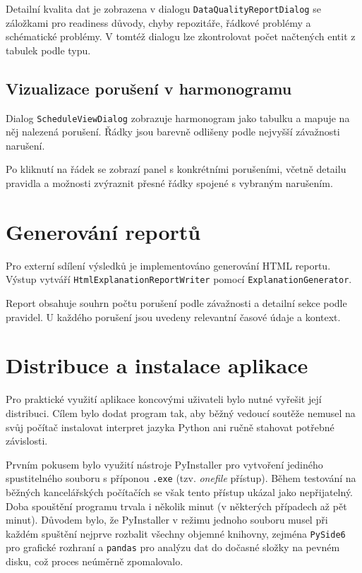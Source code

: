 \documentclass[czech, kiv, ba, he, iso690alph, pdf]{fasthesis}
\begin{document}
				Detailní kvalita dat je zobrazena v dialogu \texttt{DataQualityReportDialog} se záložkami pro readiness důvody, chyby repozitáře, řádkové problémy a schématické problémy. V tomtéž dialogu lze zkontrolovat počet načtených entit z tabulek podle typu.
	
			\subsection{Vizualizace porušení v harmonogramu}
				Dialog \texttt{ScheduleViewDialog} zobrazuje harmonogram jako tabulku a mapuje na něj nalezená porušení. Řádky jsou barevně odlišeny podle nejvyšší závažnosti narušení.
	
				Po kliknutí na řádek se zobrazí panel s konkrétními porušeními, včetně detailu pravidla a možnosti zvýraznit přesné řádky spojené s vybraným narušením.
	
		\section{Generování reportů}
			Pro externí sdílení výsledků je implementováno generování HTML reportu. Výstup vytváří \texttt{HtmlExplanationReportWriter} pomocí \texttt{ExplanationGenerator}.
	
			Report obsahuje souhrn počtu porušení podle závažnosti a detailní sekce podle pravidel. U každého porušení jsou uvedeny relevantní časové údaje a kontext.
			
		\section{Distribuce a instalace aplikace}
			Pro praktické využití aplikace koncovými uživateli bylo nutné vyřešit její distribuci. Cílem bylo dodat program tak, aby běžný vedoucí soutěže nemusel na svůj počítač instalovat interpret jazyka Python ani ručně stahovat potřebné závislosti.
		
			Prvním pokusem bylo využití nástroje PyInstaller pro vytvoření jediného spustitelného souboru s příponou \texttt{.exe} (tzv. \textit{onefile} přístup). Během testování na běžných kancelářských počítačích se však tento přístup ukázal jako nepřijatelný. Doba spouštění programu trvala i několik minut (v některých případech až pět minut). Důvodem bylo, že PyInstaller v režimu jednoho souboru musel při každém spuštění nejprve rozbalit všechny objemné knihovny, zejména \texttt{PySide6} pro grafické rozhraní a \texttt{pandas} pro analýzu dat do dočasné složky na pevném disku, což proces neúměrně zpomalovalo.
		
\end{document}
